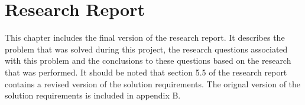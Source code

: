 \chapter{Research Report}\label{app:research_report}

This chapter includes the final version of the research report. It describes the problem that was solved during this project, the research questions associated with this problem and the conclusions to these questions based on the research that was performed. It should be noted that section 5.5 of the research report contains a revised version of the solution requirements. The orignal version of the solution requirements is included in appendix B.

